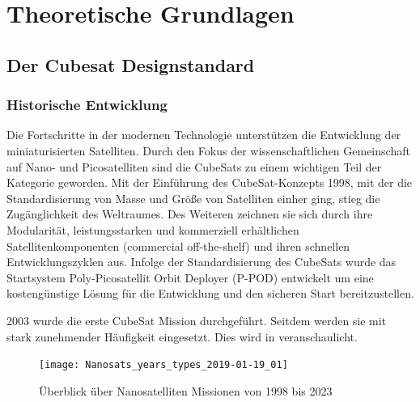 \chapter{Theoretische Grundlagen}
\section{Der Cubesat Designstandard}%
	\subsection{Historische Entwicklung}
Die Fortschritte in der modernen Technologie unterstützen die Entwicklung der miniaturisierten Satelliten. Durch den Fokus der wissenschaftlichen Gemeinschaft auf Nano- und Picosatelliten sind die CubeSats zu einem wichtigen Teil der Kategorie geworden. Mit der Einführung des CubeSat-Konzepts 1998, mit der die Standardisierung von Masse und Größe von Satelliten einher ging, stieg die Zugänglichkeit des Weltraumes. Des Weiteren zeichnen sie sich durch ihre Modularität, leistungsstarken und kommerziell erhältlichen Satellitenkomponenten (commercial off-the-shelf) und ihren schnellen Entwicklungszyklen aus. Infolge der Standardisierung des CubeSats wurde das Startsystem Poly-Picosatellit Orbit Deployer (P-POD) entwickelt um eine kostengünstige Lösung für die Entwicklung und den sicheren Start bereitzustellen. \cite[S. 1 - 4]{RahmatSamii.2017}

2003 wurde die erste CubeSat Mission durchgeführt. Seitdem werden sie mit stark zunehmender Häufigkeit eingesetzt. Dies wird in  veranschaulicht. \cite[S. 1]{firstone}
			\begin{figure}[h]
				\centering
					\texttt{[image: Nanosats\_years\_types\_2019-01-19\_01]}
				\caption{Überblick über Nanosatelliten Missionen von 1998 bis 2023}
				\label{fig:NanosatsTypes}
			\end{figure}

	\newpage
